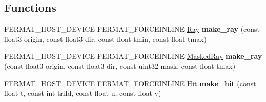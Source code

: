 \subsection*{Functions}
\begin{DoxyCompactItemize}
\item 
\mbox{\label{group___fermat_ga966fba6ceb2c5ddeb4fae8833cd18b0d}} 
F\+E\+R\+M\+A\+T\+\_\+\+H\+O\+S\+T\+\_\+\+D\+E\+V\+I\+CE F\+E\+R\+M\+A\+T\+\_\+\+F\+O\+R\+C\+E\+I\+N\+L\+I\+NE \hyperlink{struct_ray}{Ray} {\bfseries make\+\_\+ray} (const float3 origin, const float3 dir, const float tmin, const float tmax)
\item 
\mbox{\label{group___fermat_ga75478c522214d4e81e1cdb734926b23c}} 
F\+E\+R\+M\+A\+T\+\_\+\+H\+O\+S\+T\+\_\+\+D\+E\+V\+I\+CE F\+E\+R\+M\+A\+T\+\_\+\+F\+O\+R\+C\+E\+I\+N\+L\+I\+NE \hyperlink{struct_masked_ray}{Masked\+Ray} {\bfseries make\+\_\+ray} (const float3 origin, const float3 dir, const uint32 mask, const float tmax)
\item 
\mbox{\label{group___fermat_ga49721ef14701a3b24f2f3d0cfe8a98de}} 
F\+E\+R\+M\+A\+T\+\_\+\+H\+O\+S\+T\+\_\+\+D\+E\+V\+I\+CE F\+E\+R\+M\+A\+T\+\_\+\+F\+O\+R\+C\+E\+I\+N\+L\+I\+NE \hyperlink{struct_hit}{Hit} {\bfseries make\+\_\+hit} (const float t, const int tri\+Id, const float u, const float v)
\end{DoxyCompactItemize}
